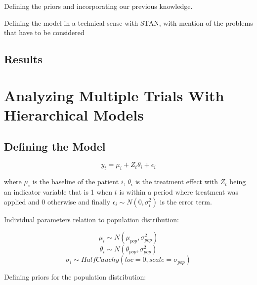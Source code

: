 \documentclass[12pt,a4paper,leqno]{report}
\theoremstyle{plain}
\theoremstyle{definition}
\theoremstyle{remark}
\begin{document}
Defining the priors and incorporating our previous knowledge.

Defining the model in a technical sense with STAN, with mention of the problems that
have to be considered

\subsection{Results}\label{1results}

\section{Analyzing Multiple Trials With Hierarchical Models}\label{pooling}

\subsection{Defining the Model}\label{hiermodel}

\begin{def}\label{simulationmodel}
    \begin{equation}\label{}
        y_t = \mu_i + Z_t\theta_i + \epsilon_i
    \end{equation}
\end{def}where \(\mu_i\) is the baseline of the patient \(i\),
\(\theta_i\) is the treatment effect with \(Z_t\) being an indicator variable that is 1 when
\(t\) is within a period where treatment was applied and 0 otherwise and finally
\(\epsilon_i \sim N(0,\sigma_i^2) \) is the error term.

Individual parameters relation to population distribution:

\begin{def}\label{simulationmodel}
    \begin{equation}\label{}
        \mu_i \sim N(\mu_{pop}, \sigma_{pop}^2)
    \end{equation}
    \begin{equation}\label{}
        \theta_i \sim N(\theta_{pop}, \sigma_{pop}^2)
    \end{equation}
    \begin{equation}\label{}
        \sigma_i \sim HalfCauchy(loc=0, scale=\sigma_{pop})
    \end{equation}
\end{def}

Defining priors for the population distribution:
\end{document}
